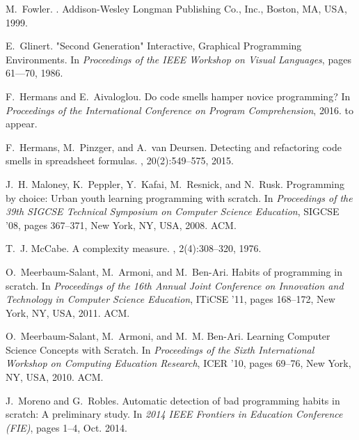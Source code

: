 \documentclass{sig-alternate-05-2015}
\begin{document}
\begin{thebibliography}{10}
	M.~Fowler.
	.
	\newblock Addison-Wesley Longman Publishing Co., Inc., Boston, MA, USA, 1999.
	
	E.~Glinert.
	 "{Second} {Generation}" {Interactive}, {Graphical}
	{Programming} {Environments}.
	\newblock In {\em Proceedings of the {IEEE} {Workshop} on {Visual}
		{Languages}}, pages 61---70, 1986.
	
	F.~Hermans and E.~Aivaloglou.
	\newblock Do code smells hamper novice programming?
	\newblock In {\em Proceedings of the International Conference on Program
		Comprehension}, 2016.
	\newblock to appear.
	
	F.~Hermans, M.~Pinzger, and A.~van Deursen.
	\newblock Detecting and refactoring code smells in spreadsheet formulas.
	, 20(2):549--575, 2015.
	
	J.~H. Maloney, K.~Peppler, Y.~Kafai, M.~Resnick, and N.~Rusk.
	\newblock Programming by choice: Urban youth learning programming with scratch.
	\newblock In {\em Proceedings of the 39th SIGCSE Technical Symposium on
		Computer Science Education}, SIGCSE '08, pages 367--371, New York, NY, USA,
	2008. ACM.
	
	T.~J. McCabe.
	\newblock A complexity measure.
	, 2(4):308--320, 1976.
	
	O.~Meerbaum-Salant, M.~Armoni, and M.~Ben-Ari.
	\newblock Habits of programming in scratch.
	\newblock In {\em Proceedings of the 16th Annual Joint Conference on Innovation
		and Technology in Computer Science Education}, ITiCSE '11, pages 168--172,
	New York, NY, USA, 2011. ACM.
	
	O.~Meerbaum-Salant, M.~Armoni, and M.~M. Ben-Ari.
	\newblock Learning {Computer} {Science} {Concepts} with {Scratch}.
	\newblock In {\em Proceedings of the {Sixth} {International} {Workshop} on
		{Computing} {Education} {Research}}, {ICER} '10, pages 69--76, New York, NY,
	USA, 2010. ACM.
	
	J.~Moreno and G.~Robles.
	\newblock Automatic detection of bad programming habits in scratch: {A}
	preliminary study.
	\newblock In {\em 2014 {IEEE} {Frontiers} in {Education} {Conference} ({FIE})},
	pages 1--4, Oct. 2014.
	

\end{thebibliography}
\end{document}

